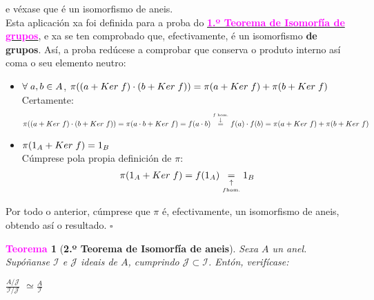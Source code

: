 \documentclass[twoside]{report}
\newcommand{\magbf}[1]{\textcolor{magenta}{\textbf{#1}}} %
\theoremstyle{mystyle}
\newtheorem{theo}{\magbf{Teorema}}[chapter]
\newenvironment{theorem}
{\begin{mdframed}[linecolor = magenta,backgroundcolor = classicrose, linewidth = 2mm]\begin{theo}}
{\end{theo}\end{mdframed}}
\begin{document}
\noindent e véxase que é un isomorfismo de aneis.\\

\noindent Esta aplicación xa foi definida para a proba do \hyperref[th1.5]{\magbf{1.º Teorema de Isomorfía de grupos}}, e xa se ten comprobado que, efectivamente, é un isomorfismo \textbf{de grupos}. Así, a proba redúcese a comprobar que conserva o produto interno así coma o seu elemento neutro:

\begin{itemize}
    
    \item $\forall \hspace{1mm} a,b \in A$, $\pi((a + Ker \hspace{1mm} f) \cdot (b + Ker \hspace{1mm} f)) = \pi(a + Ker \hspace{1mm} f) + \pi(b + Ker \hspace{1mm} f)$\\
    
    Certamente:
    $$\pi((a + Ker \hspace{1mm} f) \cdot (b + Ker \hspace{1mm} f)) = \pi(a \cdot b + Ker \hspace{1mm} f) = f(a \cdot b) \overset{\overset{f \text{ hom.}}{\downarrow}}{=} f(a) \cdot f(b) = \pi(a + Ker \hspace{1mm} f) + \pi(b + Ker \hspace{1mm} f)$$
    
    \item $\pi(1_{A} + Ker \hspace{1mm} f) = 1_{B}$\\
    
    Cúmprese pola propia definición de $\pi$: $$\pi(1_{A} + Ker \hspace{1mm} f) = f(1_{A}) \underset{\underset{f \text{hom.}}{\uparrow}}{=} 1_{B}$$
    
\end{itemize}

\noindent Por todo o anterior, cúmprese que $\pi$ é, efectivamente, un isomorfismo de aneis, obtendo así o resultado. $\square$ \pagebreak

\vspace{3mm}

\begin{theorem}[\textbf{2.º Teorema de Isomorfía de aneis}] \label{th2.2}
Sexa $A$ un anel. Supóñanse $\mathcal{I}$ e $\mathcal{J}$ ideais de $A$, cumprindo $\mathcal{J} \subset \mathcal{I}$. Entón, verifícase:
\begin{center}
    $\displaystyle \frac{A/\mathcal{J}}{\mathcal{I}/\mathcal{J}}$ $\simeq \displaystyle \frac{A}{\mathcal{I}}$
\end{center}
\end{theorem}
\end{document}
